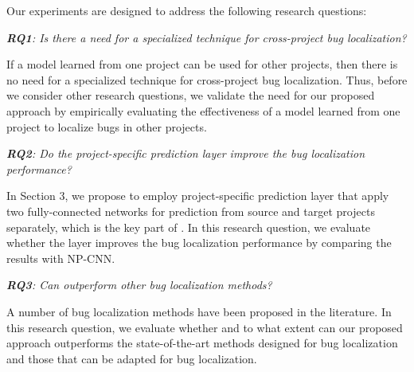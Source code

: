 
Our experiments are designed to address the following research questions:

\vspace{0.2cm}\noindent\textit{\textbf{RQ1}: Is there a need for a specialized technique for cross-project bug localization?}

If a model learned from one project can be used for other projects, then there is no need for a specialized technique for cross-project bug localization. Thus, before we consider other research questions, we validate the need for our proposed approach by empirically evaluating the effectiveness of a model learned from one project to localize bugs in other projects.

\vspace{0.2cm}\noindent\textit{\textbf{RQ2}: Do the project-specific prediction layer improve the bug localization performance?}


In Section 3, we propose to employ project-specific prediction layer that apply two fully-connected networks for prediction from source and target projects separately, which is the key part of \TRANPCNN. In this research question, we evaluate whether the layer improves the bug localization performance by comparing the results with NP-CNN.

\vspace{0.2cm}\noindent\textit{\textbf{RQ3}: Can \TRANPCNN outperform other bug localization methods?}

A number of bug localization methods have been proposed in the literature. In this research question, we evaluate whether and to what extent can our proposed approach \TRANPCNN outperforms the state-of-the-art methods designed for bug localization and those that can be adapted for bug localization. 